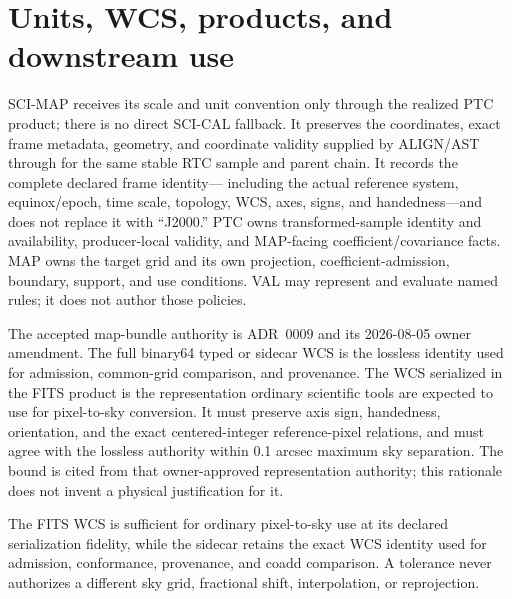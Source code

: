 \documentclass[10pt]{article}
\begin{document}
\clearpage
\section{Units, WCS, products, and downstream use}\label{sec:products}
SCI-MAP receives its scale and unit convention only through the realized PTC
product; there is no direct SCI-CAL fallback. It preserves the coordinates,
exact frame metadata, geometry, and coordinate validity supplied by ALIGN/AST
through \SCIMapASTRTCGridProfile{} for the same stable RTC
sample and parent chain. It records the complete declared frame identity---
including the actual reference system, equinox/epoch, time scale, topology,
WCS, axes, signs, and handedness---and does not replace it with ``J2000.'' PTC
owns transformed-sample identity and availability, producer-local validity,
and MAP-facing coefficient/covariance facts. MAP owns the target grid and its
own projection, coefficient-admission, boundary, support, and use conditions.
VAL may represent and evaluate named rules; it does not author those policies.

The accepted map-bundle authority is ADR~0009 and its 2026-08-05 owner
amendment. The full binary64 typed or sidecar WCS is the lossless identity used
for admission, common-grid comparison, and provenance. The WCS serialized in
the FITS product is the representation ordinary scientific tools are expected
to use for pixel-to-sky conversion. It must preserve axis sign, handedness,
orientation, and the exact centered-integer reference-pixel relations, and
must agree with the lossless authority within 0.1 arcsec maximum sky
separation. The bound is cited from that owner-approved representation
authority; this rationale does not invent a physical justification for it.

The FITS WCS is sufficient for ordinary pixel-to-sky use at its declared
serialization fidelity, while the sidecar retains the exact WCS identity used
for admission, conformance, provenance, and coadd comparison. A tolerance
never authorizes a different sky grid, fractional shift, interpolation, or
reprojection.
\end{document}
